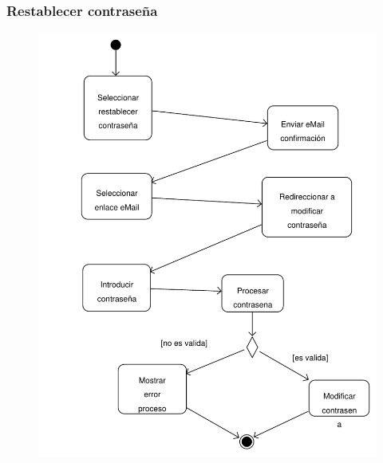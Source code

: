 \documentclass[11pt, a4paper, twoside, titlepage]{article}
\begin{document}
			\subsubsection{Restablecer contraseña}
				\begin{figure}[H]\centering
					\includegraphics[scale=.6]{diagramas/da_restablecercontrasena.pdf}
				\end{figure}
\end{document}
